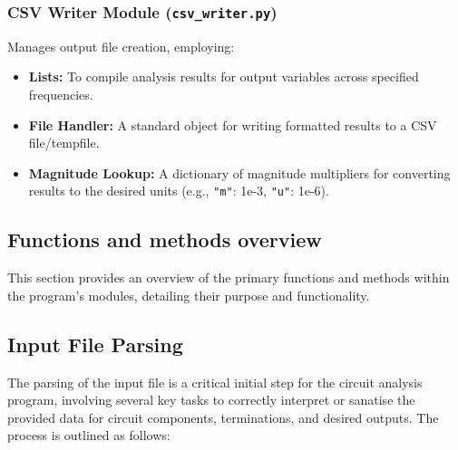 \documentclass[conference]{IEEEtran}
\begin{document}
\subsubsection*{CSV Writer Module (\texttt{csv\_writer.py})}
Manages output file creation, employing:
\begin{itemize}
    \item \textbf{Lists:} To compile analysis results for output variables across specified frequencies.
    \item \textbf{File Handler:} A standard object for writing formatted results to a CSV file/tempfile.
    \item \textbf{Magnitude Lookup:} A dictionary of magnitude multipliers for converting results to the desired units (e.g., \texttt{"m"}: 1e-3, \texttt{"u"}: 1e-6).
\end{itemize}

\subsection{Functions and methods overview}
This section provides an overview of the primary functions and methods within the program's modules, detailing their purpose and functionality.

\subsection*{Input File Parsing}
The parsing of the input file is a critical initial step for the circuit analysis program,
 involving several key tasks to correctly interpret or sanatise the provided data for circuit components,
  terminations, and desired outputs. The process is outlined as follows:
\end{document}
